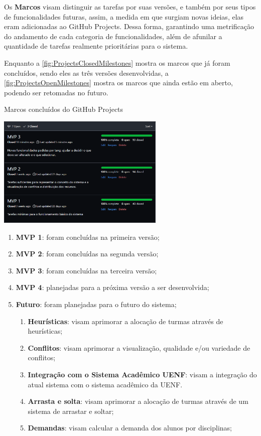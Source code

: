  \label{ssssec:Marcos e Etiquetas}

Os \textbf{Marcos} visam distinguir as tarefas por suas versões, e também por seus tipos de funcionalidades futuras, assim, a medida em que surgiam novas ideias, elas eram adicionadas ao GitHub Projects. Dessa forma, garantindo uma metrificação do andamento de cada categoria de funcionalidades, além de afunilar a quantidade de tarefas realmente prioritárias para o sistema.

Enquanto a \autoref{fig:ProjectsClosedMilestones} mostra os marcos que já foram concluídos, sendo eles as três versões desenvolvidas, a \autoref{fig:ProjectsOpenMilestones} mostra os marcos que ainda estão em aberto, podendo ser retomadas no futuro.

\begin{MyCenteredFigure} \caption{Marcos concluídos do GitHub Projects} \label{fig:ProjectsClosedMilestones}
  \includegraphics[width=0.6\textwidth]{files/img/2.02!5-desenvolvimento/2.02!5.1.4-sistema/GitHub Projects/GitHubProjects-Closed_Milestones}
\end{MyCenteredFigure}

\begin{enumerate}
  \item \textbf{MVP 1}: foram concluídas na primeira versão;
  \item \textbf{MVP 2}: foram concluídas na segunda versão;
  \item \textbf{MVP 3}: foram concluídas na terceira versão;
  \item \textbf{MVP 4}: planejadas para a próxima versão a ser desenvolvida;
  \item \textbf{Futuro}: foram planejadas para o futuro do sistema;
        \begin{enumerate}
          \item \textbf{Heurísticas}: visam aprimorar a alocação de turmas através de heurísticas;
          \item \textbf{Conflitos}: visam aprimorar a visualização, qualidade e/ou variedade de conflitos;
          \item \textbf{Integração com o Sistema Acadêmico UENF}: visam a integração do atual sistema com o sistema acadêmico da UENF.
          \item \textbf{Arrasta e solta}: visam aprimorar a alocação de turmas através de um sistema de arrastar e soltar;
          \item \textbf{Demandas}: visam calcular a demanda dos alunos por disciplinas;
        \end{enumerate}
\end{enumerate}

